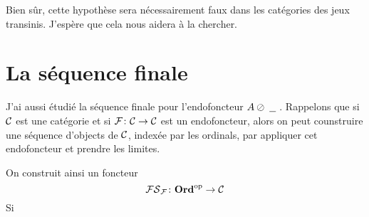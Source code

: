 \documentclass[11pt]{article}
\begin{document}
Bien s\^{u}r, cette hypoth\`{e}se sera n\'{e}cessairement faux dans les cat\'{e}gories des jeux transinis.  J'esp\`{e}re que cela nous aidera \`{a} la chercher.  

\section{La s\'{e}quence finale}

J'ai aussi \'{e}tudi\'{e} la s\'{e}quence finale pour l'endofoncteur $A\oslash\;\underline{\hspace{1.5ex}}\;$.  Rappelons que si ${\mathcal{C}}$ est une cat\'{e}gorie et si $\mathcal F\colon{\mathcal{C}}\to{\mathcal{C}}$ est un endofoncteur, alors on peut counstruire une s\'{e}quence d'objects de ${\mathcal{C}}$, index\'{e}e par les ordinals, par appliquer cet endofoncteur et prendre les limites.  

On construit ainsi un foncteur
\[
  \mathcal{FS}_\mathcal F\colon{\normalfont\textbf{Ord}}^{\mathrm{op}}\to{\mathcal{C}}
  \]
Si 



\end{document}
